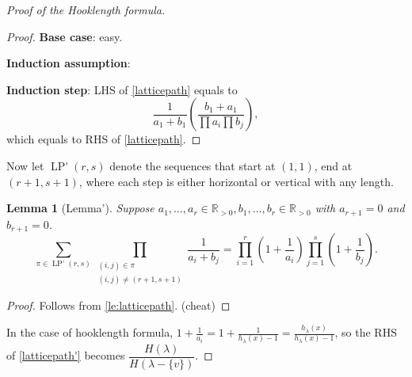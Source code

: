 \documentclass{report}
\newcommand{\R}{\mathbb{R}}
\newtheorem{lemma}{Lemma}[section]
\theoremstyle{definition}
\theoremstyle{remark}
\numberwithin{equation}{section}
\begin{document}
\begin{proof}[Proof of the Hooklength formula]
\begin{proof}
    \textbf{Base case}: easy.

    \textbf{Induction assumption}:

    \textbf{Induction step}: LHS of \eqref{latticepath} equals to \[\frac{1}{a_1 + b_1}\left(\frac{b_1 + a_1}{\prod a_i \prod b_j}\right),\]
    which equals to RHS of \eqref{latticepath}.
\end{proof}

Now let $\operatorname{LP'}(r, s)$ denote the sequences that start at $(1, 1)$, end at $(r+1, s+1)$, where each step is either horizontal or vertical with any length.
   
\begin{lemma}[Lemma']
    Suppose $a_1, \ldots, a_r \in \R_{>0}, b_1, \ldots, b_r \in \R_{>0}$ with $a_{r + 1} = 0$ and $b_{r + 1} = 0$.
    \begin{equation}\label{latticepath'}
        \sum_{\pi \in \operatorname{LP'}(r, s)} \prod_{\substack{(i, j) \in \pi \\ (i, j) \neq (r+1, s+1)}} \frac{1}{a_i + b_j} = \prod_{i=1}^r \left(1 + \frac{1}{a_i}\right)\prod_{j=1}^s \left(1 + \frac{1}{b_j}\right).
    \end{equation}
\end{lemma}
\begin{proof}
    Follows from \autoref{le:latticepath}. (cheat)
\end{proof}

In the case of hooklength formula, $\displaystyle 1 + \frac{1}{a_i} = 1 + \frac{1}{h_\lambda(x) - 1} = \frac{h_\lambda(x)}{h_\lambda(x) - 1}$, so the RHS of \eqref{latticepath'} becomes $\dfrac{H(\lambda)}{H(\lambda - \{v\})}$.
\end{proof}
\end{document}
